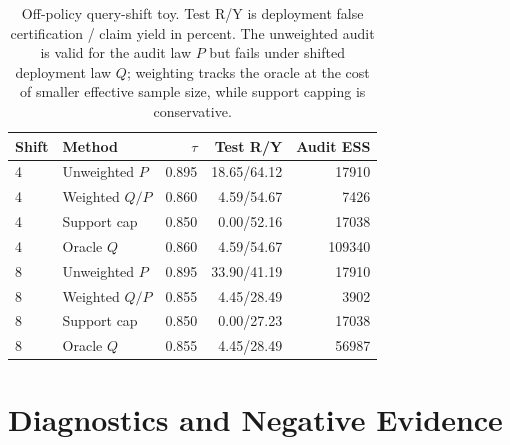\documentclass[letterpaper]{article}
\begin{document}
\begin{table}[!ht]
\centering
\small
\setlength{\tabcolsep}{4pt}
\begin{tabular}{llrrr}
\toprule
Shift & Method & $\tau$ & Test R/Y & Audit ESS \\
\midrule
4 & Unweighted $P$ & 0.895 & 18.65/64.12 & 17910 \\
4 & Weighted $Q/P$ & 0.860 & 4.59/54.67 & 7426 \\
4 & Support cap & 0.850 & 0.00/52.16 & 17038 \\
4 & Oracle $Q$ & 0.860 & 4.59/54.67 & 109340 \\
\midrule
8 & Unweighted $P$ & 0.895 & 33.90/41.19 & 17910 \\
8 & Weighted $Q/P$ & 0.855 & 4.45/28.49 & 3902 \\
8 & Support cap & 0.850 & 0.00/27.23 & 17038 \\
8 & Oracle $Q$ & 0.855 & 4.45/28.49 & 56987 \\
\bottomrule
\end{tabular}
\caption{Off-policy query-shift toy. Test R/Y is deployment false
certification / claim yield in percent. The unweighted audit is valid for the
audit law $P$ but fails under shifted deployment law $Q$; weighting tracks the
oracle at the cost of smaller effective sample size, while support capping is
conservative.}
\label{tab:app-offpolicy-shift}
\end{table}

\section{Diagnostics and Negative Evidence}
\end{document}
